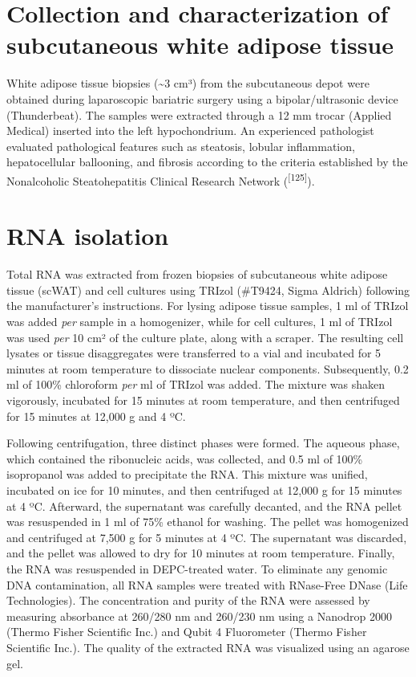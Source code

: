 \documentclass[
  11pt,
  letterpaper,
]{book}
\begin{document}
\section{Collection and characterization of subcutaneous white adipose
tissue}\label{collection-and-characterization-of-subcutaneous-white-adipose-tissue}

White adipose tissue biopsies (\textasciitilde3 cm³) from the
subcutaneous depot were obtained during laparoscopic bariatric surgery
using a bipolar/ultrasonic device (Thunderbeat). The samples were
extracted through a 12 mm trocar (Applied Medical) inserted into the
left hypochondrium. An experienced pathologist evaluated pathological
features such as steatosis, lobular inflammation, hepatocellular
ballooning, and fibrosis according to the criteria established by the
Nonalcoholic Steatohepatitis Clinical Research Network
(\textsuperscript{{[}125{]}}).

\section{RNA isolation}\label{rna-isolation}

Total RNA was extracted from frozen biopsies of subcutaneous white
adipose tissue (scWAT) and cell cultures using TRIzol (\#T9424, Sigma
Aldrich) following the manufacturer's instructions. For lysing adipose
tissue samples, 1 ml of TRIzol was added \emph{per} sample in a
homogenizer, while for cell cultures, 1 ml of TRIzol was used \emph{per}
10 cm² of the culture plate, along with a scraper. The resulting cell
lysates or tissue disaggregates were transferred to a vial and incubated
for 5 minutes at room temperature to dissociate nuclear components.
Subsequently, 0.2 ml of 100\% chloroform \emph{per} ml of TRIzol was
added. The mixture was shaken vigorously, incubated for 15 minutes at
room temperature, and then centrifuged for 15 minutes at 12,000 g and 4
ºC.

Following centrifugation, three distinct phases were formed. The aqueous
phase, which contained the ribonucleic acids, was collected, and 0.5 ml
of 100\% isopropanol was added to precipitate the RNA. This mixture was
unified, incubated on ice for 10 minutes, and then centrifuged at 12,000
g for 15 minutes at 4 ºC. Afterward, the supernatant was carefully
decanted, and the RNA pellet was resuspended in 1 ml of 75\% ethanol for
washing. The pellet was homogenized and centrifuged at 7,500 g for 5
minutes at 4 ºC. The supernatant was discarded, and the pellet was
allowed to dry for 10 minutes at room temperature. Finally, the RNA was
resuspended in DEPC-treated water. To eliminate any genomic DNA
contamination, all RNA samples were treated with RNase-Free DNase (Life
Technologies). The concentration and purity of the RNA were assessed by
measuring absorbance at 260/280 nm and 260/230 nm using a Nanodrop 2000
(Thermo Fisher Scientific Inc.) and Qubit 4 Fluorometer (Thermo Fisher
Scientific Inc.). The quality of the extracted RNA was visualized using
an agarose gel.
\end{document}
